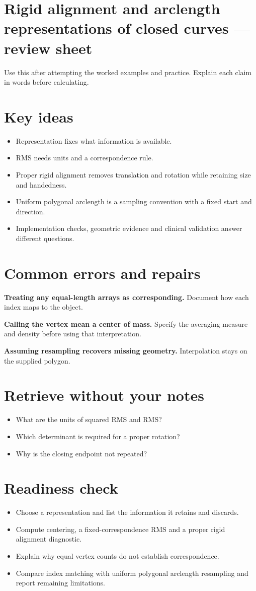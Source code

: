 \documentclass[11pt,letterpaper]{article}
\theoremstyle{definition}\newtheorem{definition}{Definition}\newtheorem{example}{Example}
\numberwithin{equation}{section}
\begin{document}
\section*{Rigid alignment and arclength representations of closed curves --- review sheet}
Use this after attempting the worked examples and practice. Explain each claim in words before calculating.

\section*{Key ideas}
\begin{itemize}
\item Representation fixes what information is available.
\item RMS needs units and a correspondence rule.
\item Proper rigid alignment removes translation and rotation while retaining size and handedness.
\item Uniform polygonal arclength is a sampling convention with a fixed start and direction.
\item Implementation checks, geometric evidence and clinical validation answer different questions.
\end{itemize}
\section*{Common errors and repairs}
\textbf{Treating any equal-length arrays as corresponding.} Document how each index maps to the object.

\textbf{Calling the vertex mean a center of mass.} Specify the averaging measure and density before using that interpretation.

\textbf{Assuming resampling recovers missing geometry.} Interpolation stays on the supplied polygon.

\section*{Retrieve without your notes}
\begin{itemize}
\item What are the units of squared RMS and RMS?
\item Which determinant is required for a proper rotation?
\item Why is the closing endpoint not repeated?
\end{itemize}
\section*{Readiness check}
\begin{itemize}
\item Choose a representation and list the information it retains and discards.
\item Compute centering, a fixed-correspondence RMS and a proper rigid alignment diagnostic.
\item Explain why equal vertex counts do not establish correspondence.
\item Compare index matching with uniform polygonal arclength resampling and report remaining limitations.
\end{itemize}
\end{document}
